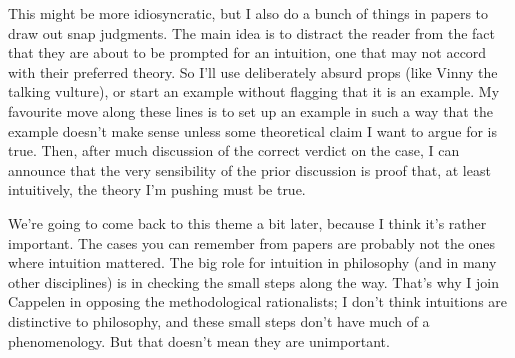 This might be more idiosyncratic, but I also do a bunch of things in papers to draw out snap judgments. The main idea is to distract the reader from the fact that they are about to be prompted for an intuition, one that may not accord with their preferred theory. So I'll use deliberately absurd props (like Vinny the talking vulture), or start an example without flagging that it is an example. My favourite move along these lines is to set up an example in such a way that the example doesn't make sense unless some theoretical claim I want to argue for is true. Then, after much discussion of the correct verdict on the case, I can announce that the very sensibility of the prior discussion is proof that, at least intuitively, the theory I'm pushing  must be true.

We're going to come back to this theme a bit later, because I think it's rather important. The cases you can remember from papers are probably not the ones where intuition mattered. The big role for intuition in philosophy (and in many other disciplines) is in checking the small steps along the way. That's why I join Cappelen in opposing the methodological rationalists; I don't think intuitions are distinctive to philosophy, and these small steps don't have much of a phenomenology. But that doesn't mean they are unimportant.

